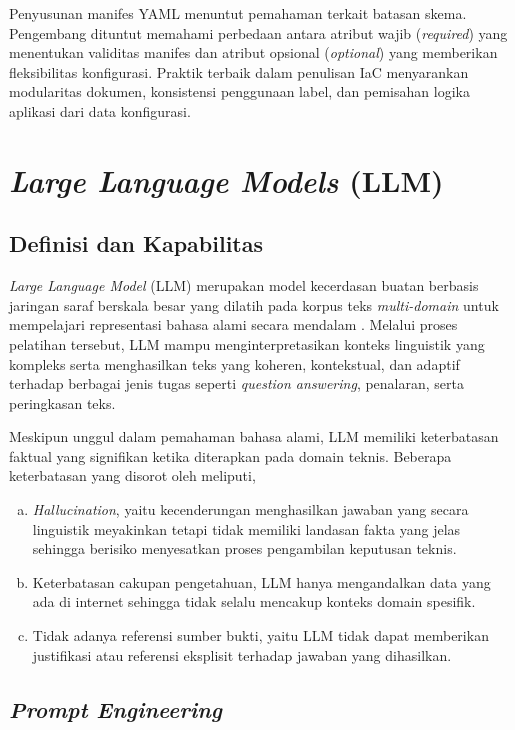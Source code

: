Penyusunan manifes YAML menuntut pemahaman terkait batasan skema. Pengembang dituntut memahami perbedaan antara atribut wajib (\textit{required}) yang menentukan validitas manifes dan atribut opsional (\textit{optional}) yang memberikan fleksibilitas konfigurasi. Praktik terbaik dalam penulisan IaC menyarankan modularitas dokumen, konsistensi penggunaan label, dan pemisahan logika aplikasi dari data konfigurasi.

\section{\textit{Large Language Models} (LLM)}
\subsection{Definisi dan Kapabilitas}
\textit{Large Language Model} (LLM) merupakan model kecerdasan buatan berbasis jaringan saraf berskala besar yang dilatih pada korpus teks \textit{multi-domain} untuk mempelajari representasi bahasa alami secara mendalam \parencite{wan2025empowering}. Melalui proses pelatihan tersebut, LLM mampu menginterpretasikan konteks linguistik yang kompleks serta menghasilkan teks yang koheren, kontekstual, dan adaptif terhadap berbagai jenis tugas seperti \textit{question answering}, penalaran, serta peringkasan teks.

Meskipun unggul dalam pemahaman bahasa alami, LLM memiliki keterbatasan faktual yang signifikan ketika diterapkan pada domain teknis. Beberapa keterbatasan yang disorot oleh \textcite{wan2025empowering} meliputi,
\begin{enumerate}[a.]
    \item \textit{Hallucination}, yaitu kecenderungan menghasilkan jawaban yang secara linguistik meyakinkan tetapi tidak memiliki landasan fakta yang jelas sehingga berisiko menyesatkan proses pengambilan keputusan teknis.
    \item Keterbatasan cakupan pengetahuan, LLM hanya mengandalkan data yang ada di internet sehingga tidak selalu mencakup konteks domain spesifik.
    \item Tidak adanya referensi sumber bukti, yaitu LLM tidak dapat memberikan justifikasi atau referensi eksplisit terhadap jawaban yang dihasilkan.
\end{enumerate}

\subsection{\textit{Prompt Engineering}}

